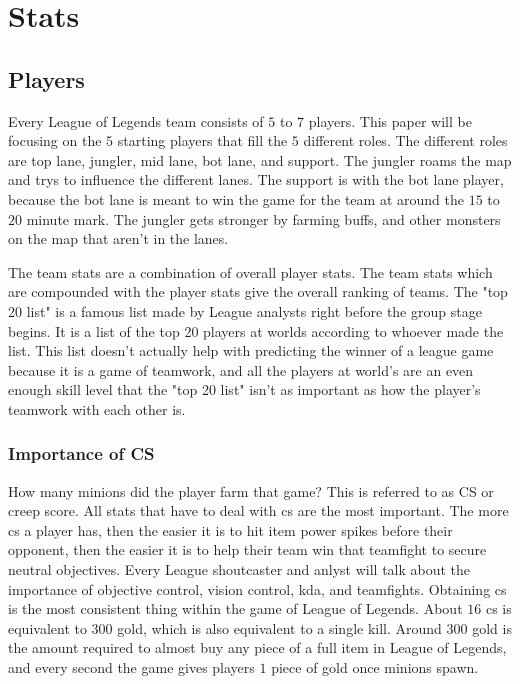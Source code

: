 \documentclass[11pt]{article}
\theoremstyle{plain}
\theoremstyle{definition}
\numberwithin{equation}{section}
\numberwithin{theorem}{section}
\numberwithin{lemma}{section}
\numberwithin{definition}{section}
\numberwithin{proposition}{section}
\numberwithin{corollary}{section}
\begin{document}
\section{Stats}
\subsection{Players}
	Every League of Legends team consists of $5$ to $7$ players. This paper will be focusing on the $5$ starting players that fill the $5$ different roles. The different roles are top lane, jungler, mid lane, bot lane, and support. The jungler roams the map and trys to influence the different lanes. The support is with the bot lane player, because the bot lane is meant to win the game for the team at around the $15$ to $20$ minute mark. The jungler gets stronger by farming buffs, and other monsters on the map that aren't in the lanes. 
	
	
	The team stats are a combination of overall player stats. The team stats which are compounded with the player stats give the overall ranking of teams. The "top 20 list" is a famous list made by League analysts right before the group stage begins. It is a list of the top 20 players at worlds according to whoever made the list. This list doesn't actually help with predicting the winner of a league game because it is a game of teamwork, and all the players at world's are an even enough skill level that the "top 20 list" isn't as important as how the player's teamwork with each other is.
	
\subsubsection{Importance of CS}
	How many minions did the player farm that game? This is referred to as CS or creep score. All stats that have to deal with cs are the most important. The more cs a player has, then the easier it is to hit item power spikes before their opponent, then the easier it is to help their team win that teamfight to secure neutral objectives. Every League shoutcaster and anlyst will talk about the importance of objective control, vision control, kda, and teamfights. Obtaining cs is the most consistent thing within the game of League of Legends. About $16$ cs is equivalent to $300$ gold, which is also equivalent to a single kill. Around $300$ gold is the amount required to almost buy any piece of a full item in League of Legends, and every second the game gives players $1$ piece of gold once minions spawn.
	
\end{document}
